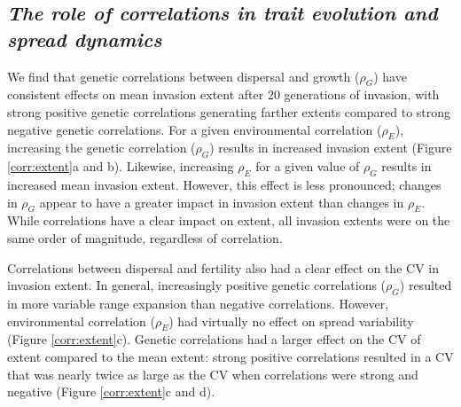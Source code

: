 

\subsection{}

\subsection{\textit{The role of correlations in trait evolution and spread dynamics}}

We find that genetic correlations between dispersal and growth ($\rho_{G}$) have consistent effects on mean invasion extent after 20 generations of invasion, with strong positive genetic correlations generating farther extents compared to strong negative genetic correlations. For a given environmental correlation ($\rho_{E}$), increasing the genetic correlation ($\rho_{G}$) results in increased invasion extent (Figure \ref{corr:extent}a and b). Likewise, increasing $\rho_{E}$ for a given value of $\rho_{G}$ results in increased mean invasion extent. However, this effect is less pronounced; changes in $\rho_{G}$ appear to have a greater impact in invasion extent than changes in $\rho_{E}$.  While correlations have a clear impact on extent, all invasion extents were on the same order of magnitude, regardless of correlation. 


Correlations between dispersal and fertility also had a clear effect on the CV in invasion extent. In general, increasingly positive genetic correlations ($\rho_{G}$) resulted in more variable range expansion than negative correlations. However, environmental correlation ($\rho_{E}$) had virtually no effect on spread variability (Figure \ref{corr:extent}c). Genetic correlations had a larger effect on the CV of extent compared to the mean extent: strong positive correlations resulted in a CV that was nearly twice as large as the CV when correlations were strong and negative (Figure \ref{corr:extent}c and d).

